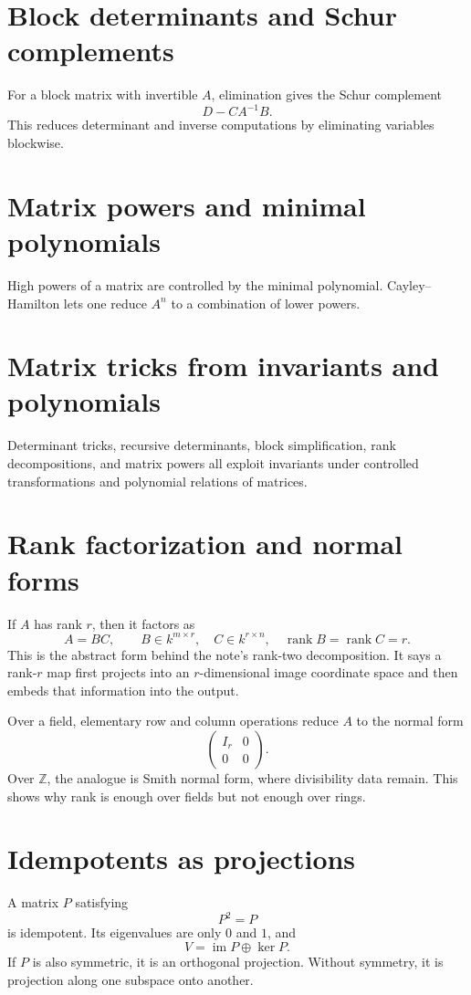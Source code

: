 \section{Block determinants and Schur complements}
For a block matrix with invertible \(A\), elimination gives the Schur complement
\[
D-CA^{-1}B.
\]
This reduces determinant and inverse computations by eliminating variables blockwise.
\section{Matrix powers and minimal polynomials}
High powers of a matrix are controlled by the minimal polynomial.  Cayley--Hamilton lets one reduce \(A^n\) to a combination of lower powers.
\section{Matrix tricks from invariants and polynomials}
Determinant tricks, recursive determinants, block simplification, rank decompositions, and matrix powers all exploit invariants under controlled transformations and polynomial relations of matrices.

\section{Rank factorization and normal forms}

If $A$ has rank $r$, then it factors as
\[
  A=BC,\qquad B\in k^{m\times r},\quad C\in k^{r\times n},\quad \operatorname{rank}B=\operatorname{rank}C=r.
\]
This is the abstract form behind the note's rank-two decomposition.  It says a rank-$r$ map first projects into an $r$-dimensional image coordinate space and then embeds that information into the output.

Over a field, elementary row and column operations reduce $A$ to the normal form
\[
  \begin{pmatrix}I_r&0\\0&0\end{pmatrix}.
\]
Over $\mathbb Z$, the analogue is Smith normal form, where divisibility data remain.  This shows why rank is enough over fields but not enough over rings.

\section{Idempotents as projections}

A matrix $P$ satisfying
\[
  P^2=P
\]
is idempotent.  Its eigenvalues are only $0$ and $1$, and
\[
  V=\operatorname{im}P\oplus \ker P.
\]
If $P$ is also symmetric, it is an orthogonal projection.  Without symmetry, it is projection along one subspace onto another.

